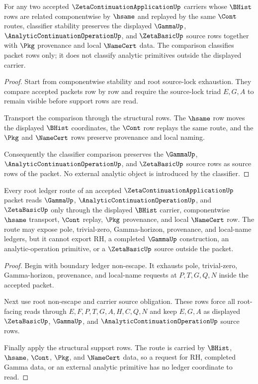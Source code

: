 \begin{theorem}
\label{thm:zeta-continuation-application-classifier-stability-obligation}
For any two accepted $\ZetaContinuationApplicationUp$ carriers whose $\BHist$ rows are related componentwise by $\hsame$ and replayed by the same $\Cont$ routes, classifier stability preserves the displayed $\GammaUp$, $\AnalyticContinuationOperationUp$, and $\ZetaBasicUp$ source rows together with $\Pkg$ provenance and local $\NameCert$ data. The comparison classifies packet rows only; it does not classify analytic primitives outside the displayed carrier.
\end{theorem}
\begin{proof}
Start from componentwise stability and root source-lock exhaustion. They compare accepted packets row by row and require the source-lock triad $E,G,A$ to remain visible before support rows are read.

Transport the comparison through the structural rows. The $\hsame$ row moves the displayed $\BHist$ coordinates, the $\Cont$ row replays the same route, and the $\Pkg$ and $\NameCert$ rows preserve provenance and local naming.

Consequently the classifier comparison preserves the $\GammaUp$, $\AnalyticContinuationOperationUp$, and $\ZetaBasicUp$ source rows as source rows of the packet. No external analytic object is introduced by the classifier.
\end{proof}

\begin{theorem}
\label{thm:zeta-continuation-application-ledger-route-obligation}
Every root ledger route of an accepted $\ZetaContinuationApplicationUp$ packet reads $\GammaUp$, $\AnalyticContinuationOperationUp$, and $\ZetaBasicUp$ only through the displayed $\BHist$ carrier, componentwise $\hsame$ transport, $\Cont$ replay, $\Pkg$ provenance, and local $\NameCert$ row. The route may expose pole, trivial-zero, Gamma-horizon, provenance, and local-name ledgers, but it cannot export RH, a completed $\GammaUp$ construction, an analytic-operation primitive, or a $\ZetaBasicUp$ source outside the packet.
\end{theorem}
\begin{proof}
Begin with boundary ledger non-escape. It exhausts pole, trivial-zero, Gamma-horizon, provenance, and local-name requests at $P,T,G,Q,N$ inside the accepted packet.

Next use root non-escape and carrier source obligation. These rows force all root-facing reads through $E,F,P,T,G,A,H,C,Q,N$ and keep $E,G,A$ as displayed $\ZetaBasicUp$, $\GammaUp$, and $\AnalyticContinuationOperationUp$ source rows.

Finally apply the structural support rows. The route is carried by $\BHist$, $\hsame$, $\Cont$, $\Pkg$, and $\NameCert$ data, so a request for RH, completed Gamma data, or an external analytic primitive has no ledger coordinate to read.
\end{proof}
